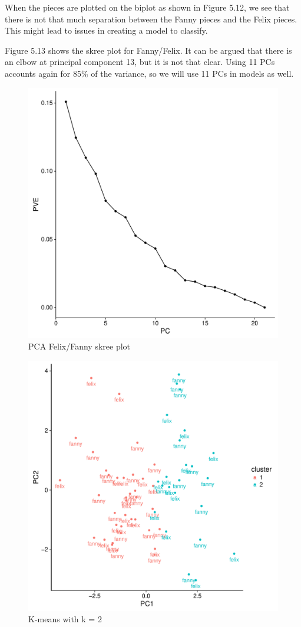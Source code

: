 \documentclass[12pt,twoside]{reedthesis}
\theoremstyle{definition}
\theoremstyle{definition}
\theoremstyle{definition}
\theoremstyle{remark}
\begin{document}
When the pieces are plotted on the biplot as shown in Figure 5.12, we
see that there is not that much separation between the Fanny pieces and
the Felix pieces. This might lead to issues in creating a model to
classify.

Figure 5.13 shows the skree plot for Fanny/Felix. It can be argued that
there is an elbow at principal component 13, but it is not that clear.
Using 11 PCs accounts again for 85\% of the variance, so we will use 11
PCs in models as well.
\begin{figure}[H]
\centering
\includegraphics[scale = .5]{images/skree_f.pdf}
\caption{PCA Felix/Fanny skree plot}
\label{subd}
\end{figure}
\begin{figure}[H]
\centering
\includegraphics[scale = .5]{images/kmeans_2_f.pdf}
\caption{K-means with k = 2}
\label{subd}
\end{figure}
\end{document}
